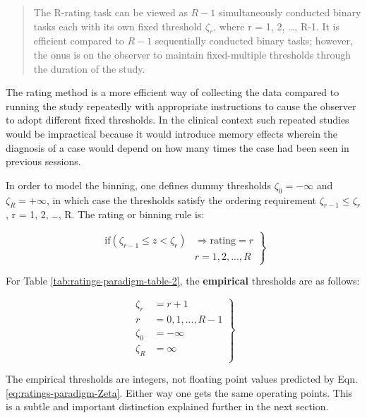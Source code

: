 \documentclass[
]{book}
\begin{document}
\begin{quote}
The R-rating task can be viewed as \(R-1\) simultaneously conducted binary tasks each with its own fixed threshold \(\zeta_r\), where r = 1, 2, \ldots, R-1. It is efficient compared to \(R-1\) sequentially conducted binary tasks; however, the onus is on the observer to maintain fixed-multiple thresholds through the duration of the study.
\end{quote}

The rating method is a more efficient way of collecting the data compared to running the study repeatedly with appropriate instructions to cause the observer to adopt different fixed thresholds. In the clinical context such repeated studies would be impractical because it would introduce memory effects wherein the diagnosis of a case would depend on how many times the case had been seen in previous sessions.

In order to model the binning, one defines dummy thresholds \(\zeta_0 = - \infty\) and \(\zeta_R = + \infty\), in which case the thresholds satisfy the ordering requirement \(\zeta_{r-1} \le \zeta_r\) , r = 1, 2, \ldots, R. The rating or binning rule is:

\begin{equation}
\left.
\begin{aligned}  
\text{if} \left (\zeta_{r-1} \le z < \zeta_r  \right )&\Rightarrow \text{rating} = r\\
&r = 1, 2, ..., R
\end{aligned}
\right \}
\label{eq:ratings-paradigm-binning-rule}
\end{equation}

For Table \ref{tab:ratings-paradigm-table-2}, the \textbf{empirical} thresholds are as follows:

\begin{equation} 
\left.
\begin{aligned}
\zeta_r &= r + 1 \\
r &= 0, 1, ..., R-1\\
\zeta_0 &= -\infty\\
\zeta_R &= \infty\\
\end{aligned}
\right \}
\label{eq:ratings-paradigm-empirical-zeta}
\end{equation}

The empirical thresholds are integers, not floating point values predicted by Eqn. \eqref{eq:ratings-paradigm-Zeta}. Either way one gets the same operating points. This is a subtle and important distinction explained further in the next section.
\end{document}
